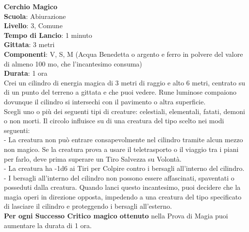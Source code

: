 \begin{multicols}{2}
\medskip\textbf{Cerchio Magico}\\
\textbf{Scuola}: Abiurazione\\
\textbf{Livello}: 3, Comune\\
\textbf{Tempo di Lancio}: 1 minuto\\
\textbf{Gittata}: 3 metri\\
\textbf{Componenti}: V, S, M (Acqua Benedetta o argento e ferro in polvere del valore di almeno 100 mo, che l'incantesimo consuma)\\
\textbf{Durata}: 1 ora\\
Crei un cilindro di energia magica di 3 metri di raggio e alto 6 metri, centrato su di un punto del terreno a gittata e che puoi vedere. Rune luminose compaiono dovunque il cilindro si intersechi con il pavimento o altra superficie.\\
Scegli uno o più dei seguenti tipi di creature: celestiali, elementali, fatati, demoni o non morti. Il circolo influisce su di una creatura del tipo scelto nei modi seguenti:\\

- La creatura non può entrare consapevolmente nel cilindro tramite alcun mezzo non magico. Se la creatura prova a usare il teletrasporto o il viaggio tra i piani per farlo, deve prima superare un Tiro Salvezza su Volontà.\\

- La creatura ha -1d6 ai Tiri per Colpire contro i bersagli all'interno del cilindro.\\

- I bersagli all'interno del cilindro non possono essere affascinati, spaventati o posseduti dalla creatura. Quando lanci questo incantesimo, puoi decidere che la magia operi in direzione opposta, impedendo a una creatura del tipo specificato di lasciare il cilindro e proteggendo i bersagli all'esterno.\\

\textbf{Per ogni Successo Critico magico ottenuto} nella Prova di Magia puoi aumentare la durata di 1 ora.


\end{multicols}
